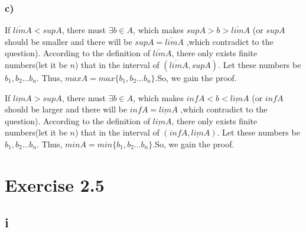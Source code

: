 \documentclass[11pt,twoside,a4paper]{article}
\begin{document}
\subsubsection{c)}
If $\overline{lim}A < supA$, there must $\exists b \in A$, which makes $supA>b>\overline{lim}A$  (or $supA$ should be smaller and there will be $supA=\overline{lim}A$ ,which contradict to the question).
According to the definition of $\overline{lim}A$, there only exists finite numbers(let it be $n$) that in the interval of $(\overline{lim}A,supA)$. Let these numbers be $b{_1},b{_2}...b{_n}$. Thus, $maxA=max\{b{_1},b{_2}...b{_n}\}$.So, we gain the proof.
\par\noindent
If $\underline{lim}A > supA$, there must $\exists b \in A$, which makes $infA<b<\underline{lim}A$  (or $infA$ should be larger and there will be $infA=\underline{lim}A$ ,which contradict to the question).
According to the definition of $\underline{lim}A$, there only exists finite numbers(let it be $n$) that in the interval of $(infA,\underline{lim}A)$. Let these numbers be $b{_1},b{_2}...b{_n}$. Thus, $minA=min\{b{_1},b{_2}...b{_n}\}$.So, we gain the proof.






\section{Exercise 2.5}
\subsection{i}
\end{document}
